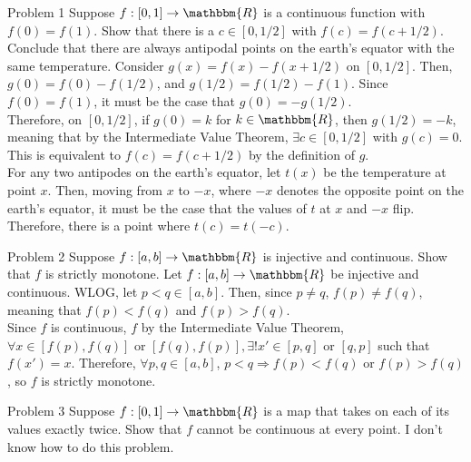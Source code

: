 \documentclass[10pt]{extarticle}
\title{}
\author{}
\date{}
\newcommand{\R}{\mathbbm{R}}
\begin{document}
  \begin{problem}{Problem 1}
    Suppose $f:[0,1]\rightarrow \R$ is a continuous function with $f(0) = f(1)$. Show that there is a $c\in [0,1/2]$ with $f(c) = f(c + 1/2)$. Conclude that there are always antipodal points on the earth's equator with the same temperature.
    \tcblower
    Consider $g(x) = f(x) - f(x+1/2)$ on $[0,1/2]$. Then, $g(0) = f(0) - f(1/2)$, and $g(1/2) = f(1/2) - f(1)$. Since $f(0) = f(1)$, it must be the case that $g(0) = -g(1/2)$.\\

    Therefore, on $[0,1/2]$, if $g(0) = k$ for $k\in\R$, then $g(1/2) = -k$, meaning that by the Intermediate Value Theorem, $\exists c\in [0,1/2]$ with $g(c)=  0$. This is equivalent to $f(c) = f(c+1/2)$ by the definition of $g$.\\

    For any two antipodes on the earth's equator, let $t(x)$ be the temperature at point $x$. Then, moving from $x$ to $-x$, where $-x$ denotes the opposite point on the earth's equator, it must be the case that the values of $t$ at $x$ and $-x$ flip. Therefore, there is a point where $t(c) = t(-c)$.
  \end{problem}
  \begin{problem}{Problem 2}
    Suppose $f: [a,b] \rightarrow \R$ is injective and continuous. Show that $f$ is strictly monotone.
    \tcblower
    Let $f: [a,b] \rightarrow \R$ be injective and continuous. WLOG, let $p < q \in [a,b]$. Then, since $p\neq q$, $f(p) \neq f(q)$, meaning that $f(p) < f(q)$ and $f(p) > f(q)$.\\

    Since $f$ is continuous, $f$ by the Intermediate Value Theorem, $\forall x\in [f(p),f(q)]$ or  $[f(q),f(p)], \exists!x'\in [p,q]$ or $[q,p]$ such that $f(x') = x$. Therefore, $\forall p,q\in [a,b]$, $p < q \Rightarrow f(p) < f(q)$ or $f(p) > f(q)$, so $f$ is strictly monotone.
  \end{problem}
  \begin{problem}{Problem 3}
    Suppose $f: [0,1]\rightarrow \R$ is a map that takes on each of its values exactly twice. Show that $f$ cannot be continuous at every point.
    \tcblower
    I don't know how to do this problem.
  \end{problem}
\end{document}
